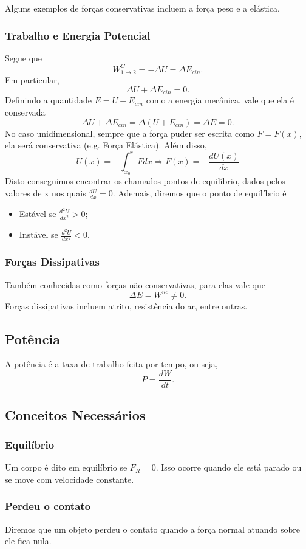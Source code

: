 \documentclass{article}
\begin{document}
  Alguns exemplos de for\c cas conservativas incluem a for\c ca peso e a elástica.
\subsubsection{Trabalho e Energia Potencial}
  Segue que 
    \[
      W_{1\rightarrow2}^{C} = -\Delta U = \Delta E_{cin}.
    \]
  Em particular, 
    \[
      \Delta U + \Delta E_{cin} = 0.
    \]
  Definindo a quantidade \(E = U + E_{cin}\) como a energia mecânica, vale que ela
é conservada 
  \[
    \Delta U + \Delta E_{cin} = \Delta (U + E_{cin}) = \Delta E = 0.
  \]
  No caso unidimensional, sempre que a for\c ca puder ser escrita como \(F = F(x),\)
ela será conservativa (e.g. For\c ca Elástica). Além disso, 
  \[
    U(x) = - \int_{x_{0}}^{x}F dx \Rightarrow F(x) = -\frac{dU(x)}{dx}
  \]
  Disto conseguimos encontrar os chamados pontos de equilíbrio, dados pelos valores
de x nos quais \(\frac{dU}{dx} = 0.\) Ademais, diremos que o ponto de equilíbrio é
\begin{itemize}
  \item Estável se \(\frac{d^{2}U}{dx^{2}} > 0\);
  \item Instável se \(\frac{d^{2}U}{dx^{2}} < 0\).
\end{itemize}
\subsubsection{For\c cas Dissipativas}
  Também conhecidas como for\c cas não-conservativas, para elas vale que 
    \[
      \Delta E = W^{nc}\neq 0.
    \]
  For\c cas dissipativas incluem atrito, resistência do ar, entre outras.
\subsection{Potência}
  A potência é a taxa de trabalho feita por tempo, ou seja, 
    \[
      P = \frac{dW}{dt}.
    \]
\subsection{Conceitos Necessários}
\subsubsection{Equilíbrio}
  Um corpo é dito em equilíbrio se \(F_{R} = 0\). Isso ocorre quando ele 
está parado ou se move com velocidade constante.
\subsubsection{Perdeu o contato}
  Diremos que um objeto perdeu o contato quando a for\c ca normal atuando sobre ele fica nula.
\end{document}
